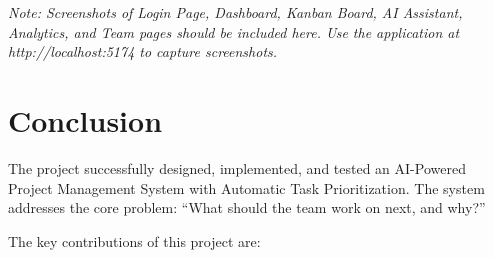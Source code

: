 \documentclass[12pt,a4paper,oneside]{report}
\begin{document}



\textit{Note: Screenshots of Login Page, Dashboard, Kanban Board, AI Assistant, Analytics, and Team pages should be included here. Use the application at http://localhost:5174 to capture screenshots.}


\chapter{Conclusion}

The project successfully designed, implemented, and tested an AI-Powered Project Management System with Automatic Task Prioritization. The system addresses the core problem: ``What should the team work on next, and why?''

The key contributions of this project are:
\end{document}
